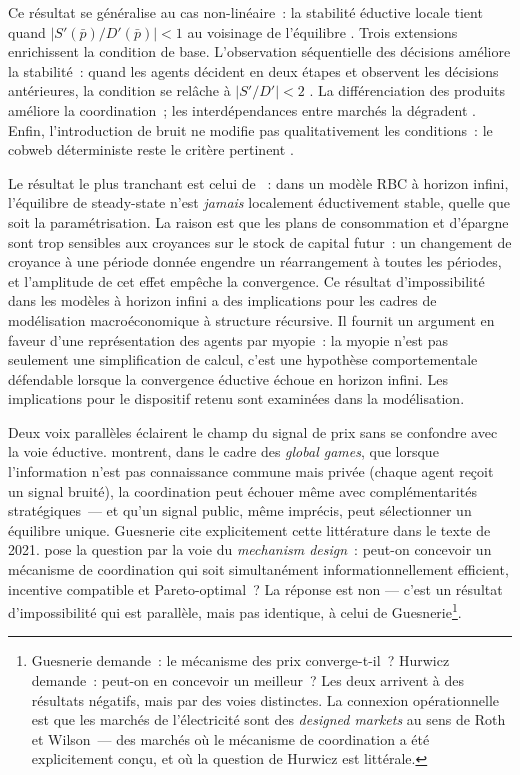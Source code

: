 Ce résultat se généralise au cas non-linéaire~: la stabilité éductive locale tient quand $|S'(\bar{p}) / D'(\bar{p})| < 1$ au voisinage de l'équilibre \parencite[Proposition~2]{guesnerie_eductive_1992}. Trois extensions enrichissent la condition de base. L'observation séquentielle des décisions améliore la stabilité~: quand les agents décident en deux étapes et observent les décisions antérieures, la condition se relâche à $|S'/D'| < 2$ \parencite[Proposition~5]{guesnerie_eductive_1992}. La différenciation des produits améliore la coordination~; les interdépendances entre marchés la dégradent \parencite[Propositions~7 et~8]{guesnerie_eductive_1992}. Enfin, l'introduction de bruit ne modifie pas qualitativement les conditions~: le cobweb déterministe reste le critère pertinent \parencite[Proposition~3]{guesnerie_eductive_1992}.

Le résultat le plus tranchant est celui de \textcite{evans_guesnerie_mcgough_2019}~: dans un modèle RBC à horizon infini, l'équilibre de steady-state n'est \emph{jamais} localement éductivement stable, quelle que soit la paramétrisation. La raison est que les plans de consommation et d'épargne sont trop sensibles aux croyances sur le stock de capital futur~: un changement de croyance à une période donnée engendre un réarrangement à toutes les périodes, et l'amplitude de cet effet empêche la convergence. Ce résultat d'impossibilité dans les modèles à horizon infini a des implications pour les cadres de modélisation macroéconomique à structure récursive. Il fournit un argument en faveur d'une représentation des agents par myopie~: la myopie n'est pas seulement une simplification de calcul, c'est une hypothèse comportementale défendable lorsque la convergence éductive échoue en horizon infini. Les implications pour le dispositif retenu sont examinées dans la modélisation.

Deux voix parallèles éclairent le champ du signal de prix sans se confondre avec la voie éductive. \textcite{morris_shin_1998,morris_shin_2003} montrent, dans le cadre des \emph{global games}, que lorsque l'information n'est pas connaissance commune mais privée (chaque agent reçoit un signal bruité), la coordination peut échouer même avec complémentarités stratégiques~--- et qu'un signal public, même imprécis, peut sélectionner un équilibre unique. Guesnerie cite explicitement cette littérature dans le texte de 2021. \textcite{hurwicz_optimality_1960} pose la question par la voie du \emph{mechanism design}~: peut-on concevoir un mécanisme de coordination qui soit simultanément informationnellement efficient, incentive compatible et Pareto-optimal~? La réponse est non --- c'est un résultat d'impossibilité qui est parallèle, mais pas identique, à celui de Guesnerie\footnote{Guesnerie demande~: le mécanisme des prix converge-t-il~? Hurwicz demande~: peut-on en concevoir un meilleur~? Les deux arrivent à des résultats négatifs, mais par des voies distinctes. La connexion opérationnelle est que les marchés de l'électricité sont des \emph{designed markets} au sens de Roth et Wilson~--- des marchés où le mécanisme de coordination a été explicitement conçu, et où la question de Hurwicz est littérale.}.

